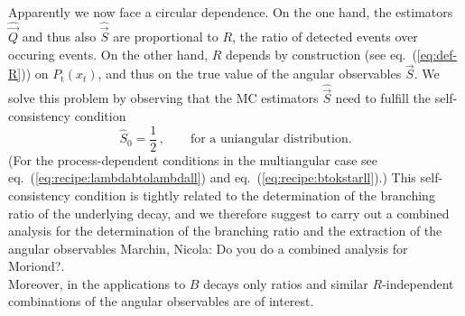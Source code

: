 \documentclass[aps,prd,reprint,nofootinbib,preprintnumbers]{revtex4}
\newcommand{\est}[1]{\widehat{#1}}
\newcommand{\refeq}[1]{eq.~(\ref{eq:#1})}
\newcommand{\vecest}[1]{\widehat{\vec{#1}}}
\newcommand{\fred}[1]{{\color{brown!85!black}#1}}
\newcommand{\add}[1]{\textcolor{green!85!black}{#1}}
\newcommand{\del}[1]{\textcolor{red!85!black}{#1}}
\begin{document}
\add{Apparently we now face a circular dependence. On the one hand,
the estimators $\vecest{Q}$ and thus also $\vecest{S}$
are proportional to $R$, the ratio of detected events over occuring events.
On the other hand, $R$ depends by construction (see \refeq{def-R})
on $P_\text{t}(x_t)$, and thus on the true value of the angular observables $\vec{S}$.
We solve this problem by observing that the MC estimators $\vecest{S}$ need to fulfill
the self-consistency condition
\begin{equation}
    \est{S}_0 = \frac{1}{2}\,,\qquad\text{for a uniangular distribution}.
\end{equation}
(For the process-dependent conditions in the multiangular case see \refeq{recipe:lambdabtolambdall} and
\refeq{recipe:btokstarll}.)
This self-consistency condition is tightly related to the determination of
the branching ratio of the underlying decay, and we therefore suggest to
carry out a combined analysis for the determination of the branching ratio
and the extraction of the angular observables \fred{Marchin, Nicola: Do you do a combined analysis for Moriond?}.\\
Moreover, in the applications to $B$ decays only ratios and similar $R$-independent combinations
of the angular observables are of interest.
}\\

\end{document}
